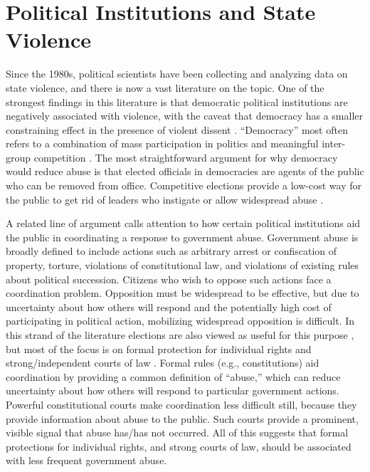\documentclass[11pt]{article}
\begin{document}
\section*{Political Institutions and State Violence}

Since the 1980s, political scientists have been collecting and analyzing data on state violence, and there is now a vast literature on the topic. One of the strongest findings in this literature is that democratic political institutions are negatively associated with violence, with the caveat that democracy has a smaller constraining effect in the presence of violent dissent \citep{Davenport2007AR,Davenport2007,DavenportMooreArmstrong2007,ConradMoore2010}. ``Democracy'' most often refers to a combination of mass participation in politics and meaningful inter-group competition \citep{Dahl1971}. The most straightforward argument for why democracy would reduce abuse is that elected officials in democracies are agents of the public who can be removed from office. Competitive elections provide a low-cost way for the public to get rid of leaders who instigate or allow widespread abuse \citep[E.g.,][]{PoeTate1994}.


A related line of argument calls attention to how certain political institutions aid the public in coordinating a response to government abuse. Government abuse is broadly defined to include actions such as arbitrary arrest or confiscation of property, torture, violations of constitutional law, and violations of existing rules about political succession. Citizens who wish to oppose such actions face a coordination problem. Opposition must be widespread to be effective, but due to uncertainty about how others will respond and the potentially high cost of participating in political action, mobilizing widespread opposition is difficult. In this strand of the literature elections are also viewed as useful for this purpose \citep[E.g.,][]{Fearon2011}, but most of the focus is on formal protection for individual rights and strong/independent courts of law \citep{NorthWeingast1989,Weingast1997,Vanberg2005,ElkinsGinsburgMelton2009,PowellStaton2009,Melton2013}. Formal rules (e.g., constitutions) aid coordination by providing a common definition of ``abuse,'' which can reduce uncertainty about how others will respond to particular government actions. Powerful constitutional courts make coordination less difficult still, because they provide information about abuse to the public. Such courts provide a prominent, visible signal that abuse has/has not occurred. All of this suggests that formal protections for individual rights, and strong courts of law, should be associated with less frequent government abuse. 
\end{document}
